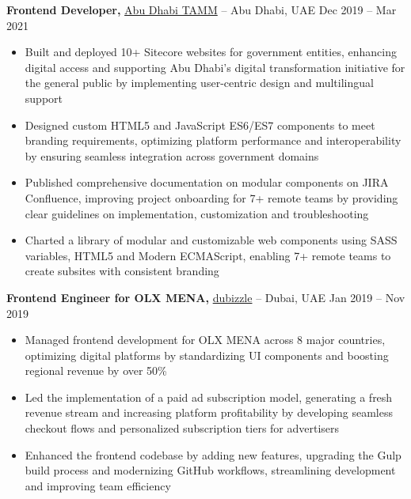 \documentclass[10pt,letterpaper]{article}
\begin{document}
\textbf{Frontend Developer,} \href{https://www.tamm.abudhabi/}{Abu Dhabi TAMM} -- Abu Dhabi, UAE \hfill Dec 2019 -- Mar 2021 \\
\vspace{-5pt}
\begin{itemize}
  \item Built and deployed 10+ Sitecore websites for government entities, enhancing digital access and supporting Abu Dhabi's digital transformation initiative for the general public by implementing user-centric design and multilingual support
  \item Designed custom HTML5 and JavaScript ES6/ES7 components to meet branding requirements, optimizing platform performance and interoperability by ensuring seamless integration across government domains
  \item Published comprehensive documentation on modular components on JIRA Confluence, improving project onboarding for 7+ remote teams by providing clear guidelines on implementation, customization and troubleshooting
  \item Charted a library of modular and customizable web components using SASS variables, HTML5 and Modern ECMAScript, enabling 7+ remote teams to create subsites with consistent branding
\end{itemize}


\textbf{Frontend Engineer for OLX MENA,} \href{https://www.dubizzle.com/}{dubizzle} -- Dubai, UAE \hfill Jan 2019 -- Nov 2019 \\
\vspace{-5pt}
\begin{itemize}
  \item Managed frontend development for OLX MENA across 8 major countries, optimizing digital platforms by standardizing UI components and boosting regional revenue by over 50\%
  \item Led the implementation of a paid ad subscription model, generating a fresh revenue stream and increasing platform profitability by developing seamless checkout flows and personalized subscription tiers for advertisers
  \item Enhanced the frontend codebase by adding new features, upgrading the Gulp build process and modernizing GitHub workflows, streamlining development and improving team efficiency
\end{itemize}
\end{document}
